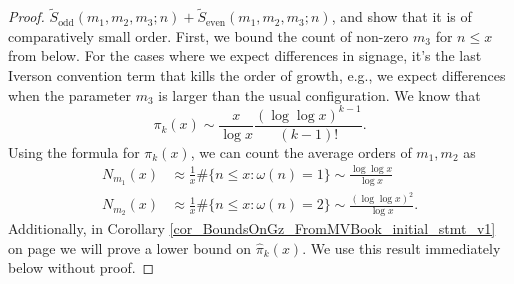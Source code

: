 \documentclass[11pt,reqno,a4letter]{article}
\numberwithin{figure}{section}
\numberwithin{table}{section}
\theoremstyle{plain}
\numberwithin{theorem}{section}
\theoremstyle{definition}
\begin{document}
\begin{proof}
$\widetilde{S}_{\operatorname{odd}}(m_1, m_2, m_3; n) + \widetilde{S}_{\operatorname{even}}(m_1, m_2, m_3; n)$, 
and show that it is of comparatively small order. First, we bound the count of non-zero $m_3$ for 
$n \leq x$ from below. 
For the cases where we expect differences in 
signage, it's the last Iverson convention term that kills the order of growth, e.g., we expect differences 
when the parameter $m_3$ is larger than the usual configuration. 
We know that 
\[
\pi_k(x) \sim \frac{x}{\log x} \frac{(\log\log x)^{k-1}}{(k-1)!}. 
\]
Using the formula for $\pi_k(x)$, we can count the average orders of $m_1,m_2$ as 
\begin{align*}
N_{m_1}(x) & \approx \frac{1}{x} \#\{n \leq x: \omega(n) = 1\} \sim \frac{\log\log x}{\log x} \\ 
N_{m_2}(x) & \approx \frac{1}{x} \#\{n \leq x: \omega(n) = 2\} \sim \frac{(\log\log x)^2}{\log x}. 
\end{align*} 
Additionally, in Corollary \ref{cor_BoundsOnGz_FromMVBook_initial_stmt_v1} on 
page \pageref{cor_BoundsOnGz_FromMVBook_initial_stmt_v1} 
we will prove a lower bound on $\widehat{\pi}_k(x)$. We use this result immediately 
below without proof. 


\end{proof}
\end{document}
